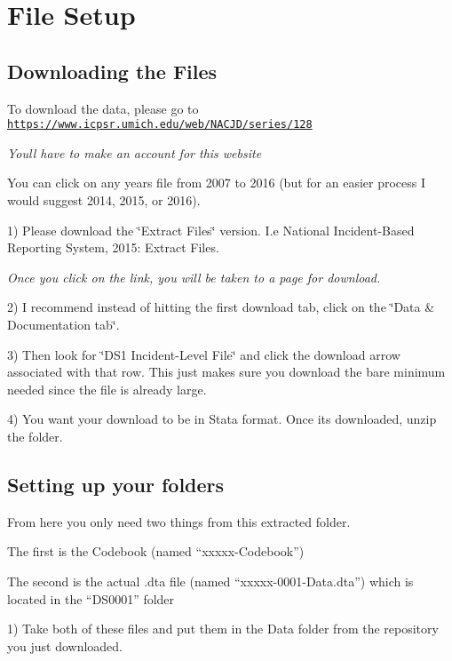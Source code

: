 \section*{File Setup}

\subsection*{Downloading the Files}

To download the data, please go to \href{https://www.icpsr.umich.edu/web/NACJD/series/128}{\tt https\+://www.\+icpsr.\+umich.\+edu/web/\+N\+A\+C\+J\+D/series/128}

{\itshape You\textquotesingle{}ll have to make an account for this website}

You can click on any year\textquotesingle{}s file from 2007 to 2016 (but for an easier process I would suggest 2014, 2015, or 2016).

1) Please download the \char`\"{}\+Extract Files\char`\"{} version. I.\+e National Incident-\/\+Based Reporting System, 2015\+: Extract Files.

{\itshape Once you click on the link, you will be taken to a page for download.}

2) I recommend instead of hitting the first download tab, click on the \char`\"{}\+Data \& Documentation tab\char`\"{}.

3) Then look for \char`\"{}\+D\+S1 Incident-\/\+Level File\char`\"{} and click the download arrow associated with that row. This just makes sure you download the bare minimum needed since the file is already large.

4) You want your download to be in Stata format. Once it\textquotesingle{}s downloaded, unzip the folder.

\subsection*{Setting up your folders}

From here you only need two things from this extracted folder.


\begin{DoxyItemize}
\item The first is the Codebook (named “xxxxx-\/\+Codebook”)
\item The second is the actual .dta file (named “xxxxx-\/0001-\/\+Data.dta”) which is located in the “\+D\+S0001” folder
\end{DoxyItemize}

1) Take both of these files and put them in the Data folder from the repository you just downloaded.

